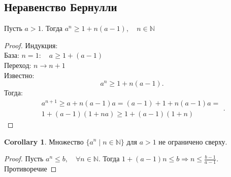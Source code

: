 \documentclass[11pt]{book}
\newcommand{\N}{\mathbb{N}}
\renewcommand{\le}{\leqslant}
\renewcommand{\ge}{\geqslant}
\theoremstyle{definition}
\theoremstyle{plain}
\theoremstyle{plain}
\theoremstyle{definition}
\newtheorem*{cor}{Corollary}
\theoremstyle{remark}
\begin{document}
\subsection{Неравенство Бернулли}\label{ques_3}
\begin{thm}
    Пусть $a>1$. Тогда $a^n \ge 1 + n(a-1), \quad n \in \N$
\end{thm}
\begin{proof}
    Индукция:\\
    База: $n = 1: \quad a \ge 1 + (a - 1)$\\
    Переход: $n \to n+1$ \\
    Известно: \[
	a^n \ge 1 +n(a-1)
    .\] 
    Тогда: 
   \[
       \begin{array}{c}
       a^{n+1} \ge a + n(a-1)a = (a-1) + 1 + n(a-1)a =\\
       1 + (a-1)(1+na) \ge 1+ (a-1)(1+n)
       \end{array}
   .\] 
\end{proof}
\begin{cor}
    Множество $\{a^n \mid n \in \N\}$ для $a > 1$ не ограничено сверху.
\end{cor}
\begin{proof}
    Пусть $a^n \le b, \quad \forall n \in \N$. Тогда $1 + (a-1)n \le b \Rightarrow n \le \frac{b-1}{a-1}$. Противоречие
\end{proof}
\end{document}
